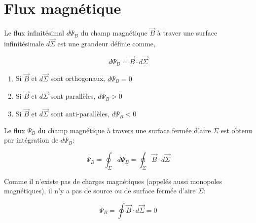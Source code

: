 \documentclass[
    11pt,
    a4paper,
    oneside,
    headinlcude, footinclude,
    twoside,
]{report}
\renewcommand{\vec}[1]{\overrightarrow{#1}}
\begin{document}
\section{Flux magnétique}
\label{sec:flux_magnetique}

Le flux infinitésimal $d\Psi_B$ du champ magnétique $\vec B$ à traver une
surface infinitésimale $d \vec \Sigma$ est une grandeur définie comme,

\begin{equation}
    \label{eq:9.12} 
    d \Psi_B = \vec B \cdot d \vec \Sigma
\end{equation}
\begin{center}
    \begin{minipage}{.55\linewidth}
        \setlength{\parskip}{.3em}
        \begin{enumerate}
            \item Si $\vec B$ et $d \vec \Sigma$ sont orthogonaux, $d \Psi_B = 0$
            \item Si $\vec B$ et $d \vec \Sigma$ sont parallèles, $d \Psi_B > 0$
            \item Si $\vec B$ et $d \vec \Sigma$ sont anti-parallèles, $d \Psi_B < 0$
        \end{enumerate}
    \end{minipage}
    \begin{minipage}{.44\linewidth}
    \end{minipage}
\end{center}

Le flux $\Psi_B$ du champ magnétique à travers une surface fermée d'aire $\Sigma$
est obtenu par intégration de $d \Psi_B$:

\begin{equation}
    \label{eq:9.13} 
    \Psi_B = \oint_\Sigma d \Psi_B = \oint_\Sigma \vec B \cdot d \vec \Sigma
\end{equation}

\begin{center}
    \begin{minipage}{.5\linewidth}
        \setlength{\parskip}{.3em}
        Comme il n'existe pas de charges magnétiques (appelés aussi monopoles
        magnétiques), il n'y a pas de source ou de surface fermée d'aire $\Sigma$:

        \begin{equation}
            \label{eq:9.14} 
            \Psi_B = \oint \vec B \cdot d \vec \Sigma = 0
        \end{equation}
    \end{minipage}
    \begin{minipage}{.49\linewidth}
    \end{minipage}
\end{center}
\end{document}
